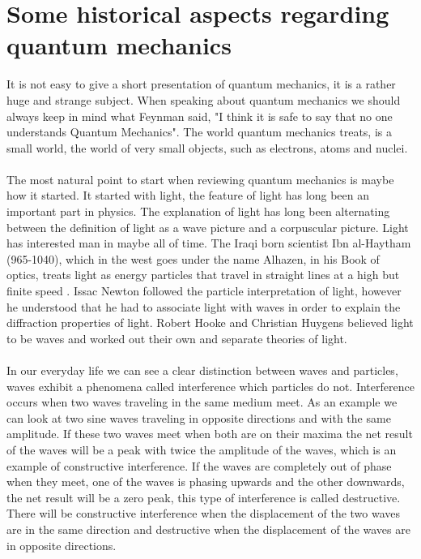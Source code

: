 \chapter{Some historical aspects regarding quantum mechanics}

It is not easy to give a short presentation of quantum mechanics, it is a rather huge and strange subject. When speaking about quantum mechanics we should always keep in mind what Feynman said, "I think it is safe to say that no one understands Quantum Mechanics". 
The world quantum mechanics treats, is a small world, the world of very small objects, such as electrons, atoms and nuclei. \\
\\
The most natural point to start when reviewing quantum mechanics is maybe how
it started. It started with light, the feature of light has long been an
important part in physics. The explanation of light has long been alternating
between the definition of light as a wave picture and a corpuscular picture.  
Light has
interested man in maybe all of time. The Iraqi born scientist Ibn
al-Haytham (965-1040), which in the west goes under the name Alhazen, in his
Book of optics, treats light as energy particles that travel in straight
lines at a high but finite speed \cite{alhazen}. Issac Newton followed the
particle interpretation of light, however he understood that he had to
associate light with waves in order to explain the diffraction properties of
light.
Robert Hooke and Christian Huygens believed light to be waves and worked out their own and separate theories of light. \\
\\
In our everyday life we can see a clear distinction between waves and
particles, waves exhibit a phenomena called interference which particles do
not. Interference occurs when two waves traveling in the same medium meet. As
an example we can look at two sine waves traveling in opposite directions and
with the same amplitude. If these two waves meet when both are on their
maxima the net result of the waves will be a peak with twice the amplitude of
the waves, which is an example of constructive interference. If the waves are
completely out of phase when they meet, one of the waves is phasing upwards
and the other downwards, the net result will be a zero peak, this type of
interference is called destructive. There will  be constructive interference
when the displacement of the two waves are in the same direction and
destructive when the displacement of the waves are in opposite directions.\\ 
